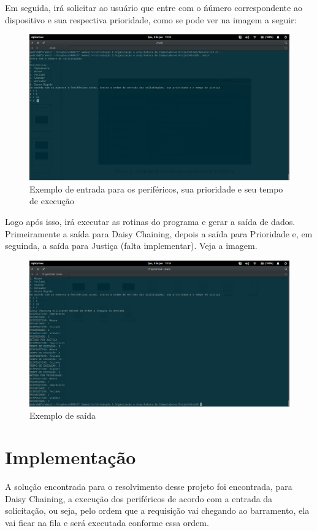 \documentclass[12pt, oneside,a4paper, brazil]{abntex2}
\begin{document}
Em seguida, irá solicitar ao usuário que entre com o ńúmero correspondente ao dispositivo e sua respectiva prioridade, como se pode ver na imagem a seguir:
\begin{figure}[!htb]
\centering
\includegraphics[scale=0.3]{img2.png}
\caption{Exemplo de entrada para os periféricos, sua prioridade e seu tempo de execução}
\label{Gráfico 1}
\end{figure}
\newpage
Logo após isso, irá executar as rotinas do programa e gerar a saída de dados. Primeiramente a saída para Daisy Chaining, depois a saída para Prioridade e, em seguinda, a saída para Justiça (falta implementar). Veja a imagem.
\begin{figure}[!htb]
\centering
\includegraphics[scale=0.3]{img3.png}
\caption{Exemplo de saída}
\label{Gráfico 1}
\end{figure}
\chapter{Implementação}
A solução encontrada para o resolvimento desse projeto foi encontrada, para Daisy Chaining, a execução dos periféricos de acordo com a entrada da solicitação, ou seja, pelo ordem que a requisição vai chegando ao barramento, ela vai ficar na fila e será executada conforme essa ordem. 
\end{document}
